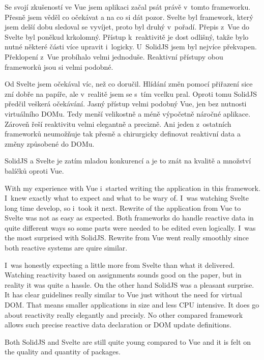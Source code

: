 \documentclass[
  master,
  program=ainf,
  printversion,
  tables=false,
  sourcecodes,
  glossaries,
  index
]{kidiplom}
\begin{document}
\begin{kiconclusions}
  Se svojí zkušeností ve Vue jsem aplikaci začal psát právě v~tomto frameworku. Přesně jsem věděl co očekávat a na
  co si dát pozor. Svelte byl framework, který jsem delší dobu sledoval se vyvíjet, proto byl druhý v~pořadí. Přepis
  z~Vue do Svelte byl poněkud krkolomný. Přístup k~reaktivitě je dost odlišný, takže bylo nutné některé části více
  upravit i~logicky. U~SolidJS jsem byl nejvíce překvapen. Překlopení z~Vue probíhalo velmi jednoduše. Reaktivní
  přístupy obou frameworků jsou si velmi podobné. 

  Od Svelte jsem očekával víc, než co doručil. Hlídání změn pomocí přiřazení sice zní dobře na papíře, ale v~realitě
  jsem se s~tím vcelku pral. Oproti tomu SolidJS předčil veškerá očekávání. Jasný přístup velmi podobný Vue, jen
  bez nutnosti virtuálního DOMu. Tedy menší velikostně a méně výpočetně náročné aplikace. Zároveň řeší reaktivitu velmi
  elegantně a precizně. Ani jeden z~ostatních frameworků neumožňuje tak přesně a chirurgicky definovat reaktivní data a
  změny způsobené do DOMu.
  
  SolidJS a Svelte je zatím mladou konkurencí a je to znát na kvalitě a množství balíčků oproti Vue. 
\end{kiconclusions}

\begin{kiconclusions}[english]
  With my experience with Vue i~started writing the application in this framework. I~knew exactly what to expect and 
  what to be wary of. I~was watching Svelte long time develop, so i~took it next. Rewrite of the application from Vue 
  to Svelte was not as easy as expected. Both frameworks do handle reactive data in quite different ways so some parts
  were needed to be edited even logically. I~was the most surprised with SolidJS. Rewrite from Vue went really smoothly
  since both reactive systems are quire similar.

  I~was honestly expecting a little more from Svelte than what it delivered. Watching reactivity based on assignments
  sounds good on the paper, but in reality it was quite a hassle. On the other hand SolidJS was a pleasant surprise. 
  It has clear guidelines really similar to Vue just without the need for virtual DOM. That means smaller applications
  in size and less CPU intensive. It does go about reactivity really elegantly and precisly. No other compared framework
  allows such precise reactive data declaration or DOM update definitions.

  Both SolidJS and Svelte are still quite young compared to Vue and it is felt on the quality and quantity of packages.
\end{kiconclusions}
\end{document}
